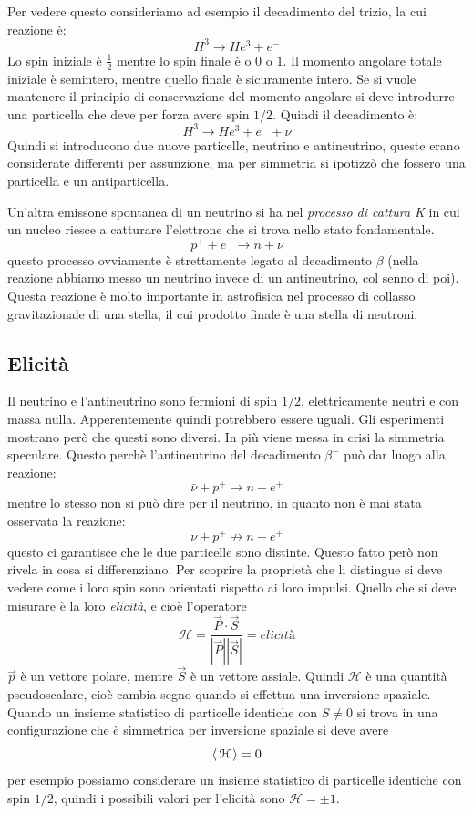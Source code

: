 Per vedere questo consideriamo ad esempio il decadimento del trizio, la cui reazione è:
\[
H^3\rightarrow He^3+e^-
\]
Lo spin iniziale è $\frac{1}{2}$ mentre lo spin finale è o $0$ o $1$. Il momento angolare totale iniziale è semintero, mentre quello finale è sicuramente intero.
Se si vuole mantenere il principio di conservazione del momento angolare si deve introdurre una particella che deve per forza avere spin $1/2$.
Quindi il decadimento è:
\[
H^3\rightarrow He^3+e^-+\nu
\]
Quindi si introducono due nuove particelle, neutrino e antineutrino, queste erano considerate differenti per assunzione, ma per simmetria si ipotizzò
che fossero una particella e un antiparticella.

Un'altra emissone spontanea di un neutrino si ha nel \textit{processo di cattura K} in cui un nucleo riesce a catturare l'elettrone che si trova nello stato fondamentale.
\[
p^++e^-\rightarrow n+\nu
\]
questo processo ovviamente è strettamente legato al decadimento $\beta$ (nella reazione abbiamo messo un neutrino invece di un antineutrino, col senno di poi).
Questa reazione è molto importante in astrofisica nel processo di collasso gravitazionale di una stella, il cui prodotto finale è una stella di neutroni.
\subsection{Elicità}
Il neutrino e l'antineutrino sono fermioni di spin $1/2$, elettricamente neutri e con massa nulla. Apperentemente quindi potrebbero essere uguali.
Gli esperimenti mostrano però che questi sono diversi. In più viene messa in crisi la simmetria speculare. Questo perchè l'antineutrino del decadimento $\beta^-$
può dar luogo alla reazione:
\[
\bar{\nu}+p^+\rightarrow n+e^+
\]
mentre lo stesso non si può dire per il neutrino, in quanto non è mai stata osservata la reazione:
\[
 \nu+p^+\nrightarrow n+e^+
\]
questo ci garantisce che le due particelle sono distinte. Questo fatto però non rivela in cosa si differenziano.
Per scoprire la proprietà che li distingue si deve vedere come i loro spin sono orientati rispetto ai loro impulsi.
Quello che si deve misurare è la loro \textit{elicità}, e cioè l'operatore
\[
\mathcal{H}=\frac{\vec{P}\cdot\vec{S}}{|\vec{P}||\vec{S}|}=\textit{elicità}
\]
$\vec{p}$ è un vettore polare, mentre $\vec{S}$ è un vettore assiale. Quindi $\mathcal{H}$ è una quantità pseudoscalare, cioè cambia segno quando si
effettua una inversione spaziale. Quando un insieme statistico di particelle identiche con $S\neq0$ si trova in una configurazione che è simmetrica per
inversione spaziale si deve avere
\[
  \left\langle\, \mathcal{H} \,\right\rangle=0
\]
per esempio possiamo considerare un insieme statistico di particelle identiche con spin $1/2$, quindi i possibili valori per l'elicità sono $\mathcal{H}=\pm1$.

